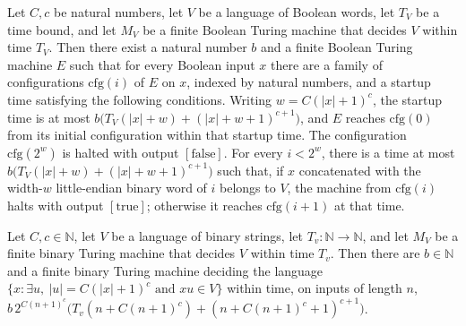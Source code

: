 \begin{theorem}
\label{Complexity.enumMachine_contracts}
\leanok
{}
Let $C,c$ be natural numbers, let $V$ be a language of Boolean words, let $T_V$ be a
time bound, and let $M_V$ be a finite Boolean Turing machine that decides $V$ within
time $T_V$. Then there exist a natural number $b$ and a finite Boolean Turing machine
$E$ such that for every Boolean input $x$ there are a family of configurations
$\mathrm{cfg}(i)$ of $E$ on $x$, indexed by natural numbers, and a startup time
satisfying the following conditions. Writing $w=C(|x|+1)^c$, the startup time is at most
$b\bigl(T_V(|x|+w)+(|x|+w+1)^{c+1}\bigr)$, and $E$ reaches $\mathrm{cfg}(0)$ from its
initial configuration within that startup time. The configuration $\mathrm{cfg}(2^w)$ is
halted with output $[\mathrm{false}]$. For every $i<2^w$, there is a time at most
$b\bigl(T_V(|x|+w)+(|x|+w+1)^{c+1}\bigr)$ such that, if $x$ concatenated with the
width-$w$ little-endian binary word of $i$ belongs to $V$, the machine from
$\mathrm{cfg}(i)$ halts with output $[\mathrm{true}]$; otherwise it reaches
$\mathrm{cfg}(i+1)$ at that time.
\end{theorem}

\begin{theorem}
\label{Complexity.exists_proj_decider}
\leanok
{}
Let $C,c\in\mathbb{N}$, let $V$ be a language of binary strings, let
$T_v:\mathbb{N}\to\mathbb{N}$, and let $M_V$ be a finite binary Turing machine that
decides $V$ within time $T_v$. Then there are $b\in\mathbb{N}$ and a finite binary
Turing machine deciding the language $\{x:\exists u,\ |u|=C(|x|+1)^c\text{ and }xu\in
V\}$ within time, on inputs of length $n$,
$b\,2^{C(n+1)^c}\bigl(T_v(n+C(n+1)^c)+(n+C(n+1)^c+1)^{c+1}\bigr)$.
\end{theorem}

